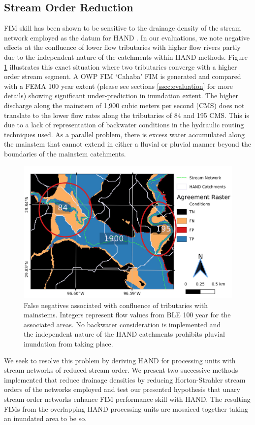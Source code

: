 \subsection{Stream Order Reduction}
\label{ssec:stream_order_reduction}
%
FIM skill has been shown to be sensitive to the drainage density of the stream network employed as the datum for HAND \cite{zhang2018comparative,mcgehee2016modified,li2020evaluation,nobre2016hand}.
In our evaluations, we note negative effects at the confluence of lower flow tributaries with higher flow rivers partly due to the independent nature of the catchments within HAND methods.
Figure \ref{fig:catchment_boundaries_issue} illustrates this exact situation where two tributaries converge with a higher order stream segment. 
A OWP FIM `Cahaba' FIM is generated and compared with a FEMA 100 year extent (please see sections \ref{ssec:evaluation} for more details) showing significant under-prediction in inundation extent.
The higher discharge along the mainstem of 1,900 cubic meters per second (CMS) does not translate to the lower flow rates along the tributaries of 84 and 195 CMS. 
This is due to a lack of representation of backwater conditions in the hydraulic routing techniques used.
As a parallel problem, there is excess water accumulated along the mainstem that cannot extend in either a fluvial or pluvial manner beyond the boundaries of the mainstem catchments.
%
\begin{figure}[h!]
\centering
\includegraphics[scale=1.0]{figures/catchment_boundaries_issue.jpg}
\caption{False negatives associated with confluence of tributaries with mainstems. Integers represent flow values from BLE 100 year for the associated areas. No backwater consideration is implemented and the independent nature of the HAND catchments prohibits pluvial inundation from taking place.}
\label{fig:catchment_boundaries_issue}
\end{figure}
%
We seek to resolve this problem by deriving HAND for processing units with stream networks of reduced stream order. 
We present two successive methods implemented that reduce drainage densities by reducing Horton-Strahler stream orders of the networks employed and test our presented hypothesis that unary stream order networks enhance FIM performance skill with HAND.
The resulting FIMs from the overlapping HAND processing units are mosaiced together taking an inundated area to be so.
%
